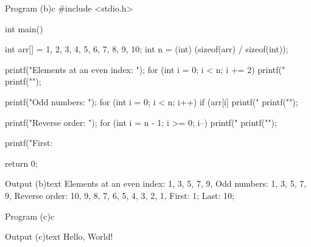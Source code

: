 \documentclass[11pt]{ipu-ai}
\begin{document}
    \begin{code}
        {Program (b)}{c}
#include <stdio.h>

int main() {
    int arr[] = {1, 2, 3, 4, 5, 6, 7, 8, 9, 10};
    int n = (int) (sizeof(arr) / sizeof(int));

    printf("Elements at an even index: ");
    for (int i = 0; i < n; i += 2) {
        printf("%
    }
    printf("\n");

    printf("Odd numbers: ");
    for (int i = 0; i < n; i++) {
        if (arr[i] %
            printf("%
    }
    printf("\n");

    printf("Reverse order: ");
    for (int i = n - 1; i >= 0; i--) {
        printf("%
    }
    printf("\n");

    printf("First: %

    return 0;
}
    \end{code}%
    \begin{code}
        {Output (b)}{text}
Elements at an even index: 1, 3, 5, 7, 9,
Odd numbers: 1, 3, 5, 7, 9,
Reverse order: 10, 9, 8, 7, 6, 5, 4, 3, 2, 1,
First: 1; Last: 10;
    \end{code}
    \begin{code}
        {Program (c)}{c}
    \end{code}%
    \begin{code}
        {Output (c)}{text}
Hello, World!
    \end{code}
    \vspace*{10pt}

\end{document}
